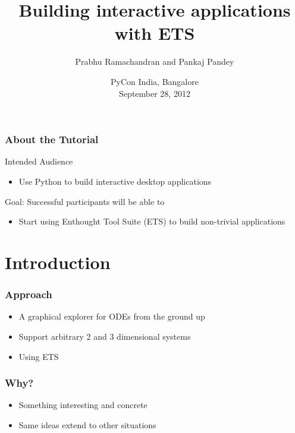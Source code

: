 \documentclass[14pt,compress]{beamer}
\title[ETS]{Building interactive applications with ETS}
\author[Prabhu and Pankaj] {Prabhu Ramachandran and Pankaj Pandey}
\institute[Enthought] {\large \pgfimage[height=3em]{enthought-logo_lg}
}
\date[] {
\small
PyCon India, Bangalore\\
September 28, 2012
}
\begin{document}
\begin{frame}
  \maketitle
\end{frame}


\begin{frame}
  \frametitle{About the Tutorial}
  \begin{block}{Intended Audience}
  \begin{itemize}
    \item Use Python to build interactive desktop applications
  \end{itemize}
  \end{block}  

  \begin{block}{Goal: Successful participants will be able to}
    \begin{itemize}
      \item Start using Enthought Tool Suite (ETS) to build non-trivial applications

    \end{itemize}
  \end{block}
\end{frame}

\section{Introduction}

\begin{frame}
  \frametitle{}
  \begin{center}
  \end{center}
\end{frame}

\begin{frame}
  \frametitle{Approach}
  \begin{itemize}
      \item A graphical explorer for ODEs \alert{from the ground up}
  \item Support arbitrary 2 and 3 dimensional systems
  \item Using ETS
 \end{itemize}
\end{frame}

\begin{frame}
  \frametitle{Why?}
  \begin{itemize}
  \item Something interesting and concrete
  \item Same ideas extend to other situations
 \end{itemize}
\end{frame}
\end{document}

